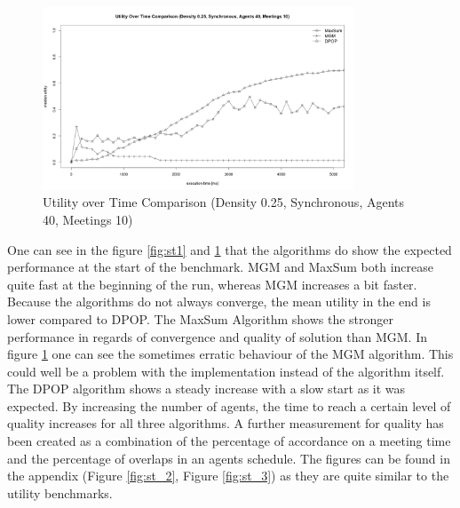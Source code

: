 \begin{figure}[H]
\centering
\includegraphics[width=350px]{graphics/experiments/static/st_3}
\caption{Utility over Time Comparison (Density 0.25, Synchronous, Agents 40, Meetings 10)}
\label{fig:st2}

\end{figure}

One can see in the figure \ref{fig:st1} and \ref{fig:st2} that the algorithms do show the expected performance at the start of the benchmark. MGM and MaxSum both increase quite fast at the beginning of the run, whereas MGM increases a bit faster. Because the algorithms do not always converge, the mean utility in the end is lower compared to DPOP. The MaxSum Algorithm shows the stronger performance in regards of convergence and quality of solution than MGM. In figure \ref{fig:st2} one can see the sometimes erratic behaviour of the MGM algorithm. This could well be a problem with the implementation instead of the algorithm itself. The DPOP algorithm shows a steady increase with a slow start as it was expected. By increasing the number of agents, the time to reach a certain level of quality increases for all three algorithms. A further measurement for quality has been created as a combination of the percentage of accordance on a meeting time and the percentage of overlaps in an agents schedule. The figures can be found in the appendix (Figure \ref{fig:st_2}, Figure \ref{fig:st_3}) as they are quite similar to the utility benchmarks.

